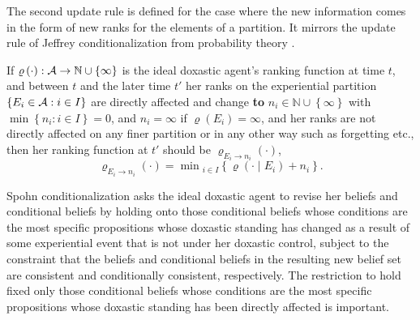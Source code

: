 The second update rule is defined for the case where the new information comes in the form of new ranks for the elements of a partition. It mirrors the update rule of Jeffrey conditionalization from probability theory \citep{j83}.
\begin{update}\label{rankrule2}
If $\varrho\left(\cdot\right):\begin{cal}A\end{cal}\rightarrow\mathbb{N}\cup\left\{\infty\right\}$ is the ideal doxastic agent's ranking function at time $t$, and between $t$ and the later time $t'$ her ranks on the experiential partition $\left\{E_i\in\begin{cal}A\end{cal}:i\in I\right\}$ are directly affected and change \textbf{to} $n_i\in\mathbb{N}\cup\left\{\infty\right\}$ with $\min\left\{n_i:i\in I\right\}=0$, and $n_i=\infty$ if $\varrho\left(E_i\right)=\infty$, and her %
ranks are not directly affected on any finer partition or in any other way such as forgetting etc., then her ranking function at $t'$ should be $\varrho_{E_i\rightarrow n_i}\left(\cdot\right)$,
$$\varrho_{E_i\rightarrow n_i}\left(\cdot\right)=\min{_{i\in I}}\left\{\varrho\left(\cdot\mid E_i\right)+n_i\right\}.$$
\end{update}
Spohn conditionalization asks the ideal doxastic agent to revise her beliefs and conditional beliefs by holding onto those conditional beliefs whose conditions are the most specific propositions whose doxastic standing has changed as a result of some experiential event that is not under her doxastic control, subject to the constraint that the beliefs and conditional beliefs in the resulting new belief set are consistent and conditionally consistent, respectively. The restriction to hold fixed only those conditional beliefs whose conditions are the most specific propositions whose doxastic standing has been directly affected is important.

